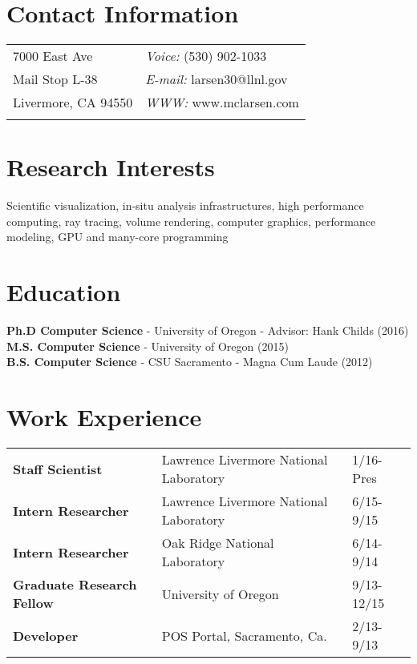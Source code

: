 \documentclass[margin,line]{res}
\begin{document}



\begin{resume}
\section{\sc Contact Information}
\vspace{.05in}
\begin{tabular}{@{}p{2in}p{4in}}
7000 East Ave     & {\it Voice:}  (530) 902-1033 \\
Mail Stop L-38   &  {\it E-mail:}  larsen30@llnl.gov\\
Livermore, CA 94550         &  {\it WWW:} www.mclarsen.com\\
                                 &  \\
\end{tabular}

\section{\sc Research Interests}
Scientific visualization, in-situ analysis infrastructures, high performance computing, ray tracing, volume rendering, computer graphics, performance modeling, GPU and many-core programming

\section{\sc Education}
\textbf{Ph.D Computer Science} - University of Oregon - Advisor: Hank Childs (2016)
\\
\textbf{M.S. Computer Science} - University of Oregon (2015)
\\
\textbf{B.S. Computer Science} - CSU Sacramento - Magna Cum Laude (2012)%

\section{\sc Work Experience}

\begin{tabular}{lll}
\textbf{Staff Scientist}	& Lawrence Livermore National Laboratory & 1/16-Pres \\
\textbf{Intern Researcher}	& Lawrence Livermore National Laboratory & 6/15-9/15 \\
\textbf{Intern Researcher}	& Oak Ridge National Laboratory & 6/14-9/14 \\
\textbf{Graduate Research Fellow}	& University of Oregon  & 9/13-12/15 \\
\textbf{Developer}	& POS Portal, Sacramento, Ca.  & 2/13-9/13 \\
\end{tabular}



\end{resume}
\end{document}
